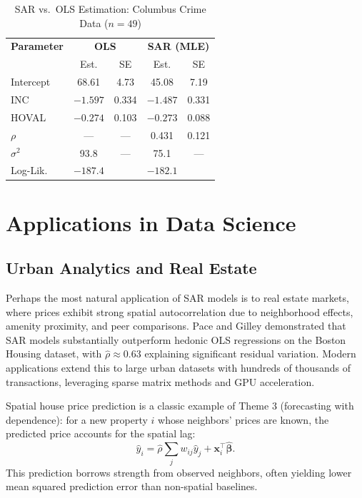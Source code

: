 \documentclass[conference]{IEEEtran}
\theoremstyle{definition}
\begin{document}
\begin{table}[t]
\centering
\caption{SAR vs.\ OLS Estimation: Columbus Crime Data ($n=49$)}
\label{tab:columbus}
\begin{tabular}{lcccc}
\toprule
\textbf{Parameter} & \multicolumn{2}{c}{\textbf{OLS}} & \multicolumn{2}{c}{\textbf{SAR (MLE)}} \\
 & Est. & SE & Est. & SE \\
\midrule
Intercept   & 68.61  & 4.73 & 45.08  & 7.19 \\
INC         & $-1.597$ & 0.334 & $-1.487$ & 0.331 \\
HOVAL       & $-0.274$ & 0.103 & $-0.273$ & 0.088 \\
$\rho$      & ---    & ---  & 0.431  & 0.121 \\
$\sigma^2$  & 93.8   & ---  & 75.1   & ---  \\
Log-Lik.    & $-187.4$ & & $-182.1$ & \\
\bottomrule
\end{tabular}
\end{table}

\section{Applications in Data Science}
\label{sec:apps}

\subsection{Urban Analytics and Real Estate}

Perhaps the most natural application of SAR models is to real estate markets, where prices exhibit strong spatial autocorrelation due to neighborhood effects, amenity proximity, and peer comparisons. Pace and Gilley \cite{pace1997sparse} demonstrated that SAR models substantially outperform hedonic OLS regressions on the Boston Housing dataset, with $\hat{\rho} \approx 0.63$ explaining significant residual variation. Modern applications extend this to large urban datasets with hundreds of thousands of transactions, leveraging sparse matrix methods and GPU acceleration.

Spatial house price prediction is a classic example of Theme 3 (forecasting with dependence): for a new property $i$ whose neighbors' prices are known, the predicted price accounts for the spatial lag:
\begin{equation}
\hat{y}_i = \hat{\rho}\sum_j w_{ij}\hat{y}_j + \mathbf{x}_i^\top\hat{\bm{\beta}}.
\end{equation}
This prediction borrows strength from observed neighbors, often yielding lower mean squared prediction error than non-spatial baselines.
\end{document}

